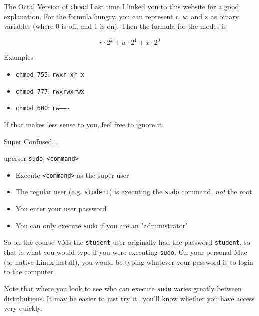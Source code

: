 \begin{frame}[fragile]{The Octal Version of \texttt{chmod}}
  Last time I linked you to this\cite{chmod} website for a good explanation.  For the formula hungry, you can
  represent \texttt{r}, \texttt{w}, and \texttt{x} as binary variables (where 0 is off, and 1 is on).  Then
  the formula for the modes is

  $$
    r\cdot2^2 + w\cdot2^1 + x\cdot2^0
  $$

  \begin{block}{Examples}
    \begin{itemize}
      \item \texttt{chmod 755}: \texttt{rwxr-xr-x}
      \item \texttt{chmod 777}: \texttt{rwxrwxrwx}
      \item \texttt{chmod 600}: \texttt{rw-------}
    \end{itemize}
  \end{block}

  If that makes less sense to you, feel free to ignore it.
\end{frame}

\begin{frame}[fragile]{Super Confused...}
  \begin{block}{uperser }
    \texttt{sudo <command>}
    \begin{itemize}
      \item Execute \texttt{<command>} as the super user
      \item The regular user (e.g. \texttt{student}) is executing the \texttt{sudo} command, \emph{not} the root
      \item You enter your user password
      \item You can only execute \texttt{sudo} if you are an "administrator"\tsup{*}
    \end{itemize}
  \end{block}

  So on the course VMs the \texttt{student} user originally had the password \texttt{student}, so that is what
  you would type if you were executing \texttt{sudo}.  On your personal Mac (or native Linux install), you would
  be typing whatever your password is to login to the computer.

  {\tiny \tsup{*}Note that where you look to see who can execute \texttt{sudo} varies greatly between distributions.  It may be
    easier to just try it...you'll know whether you have access very quickly.}
\end{frame}

